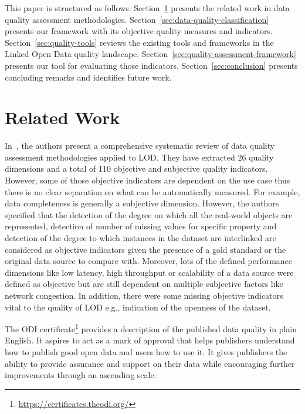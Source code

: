 \documentclass[onecolumn, crcready]{../../Util/LaTEX/iosart2c}
\begin{document}
This paper is structured as follows: Section~\ref{sec:related-work} presents the related work in data quality assessment methodologies. Section~\ref{sec:data-quality-classification} presents our framework with its objective quality measures and indicators. Section~\ref{sec:quality-tools} reviews the existing tools and frameworks in the Linked Open Data quality landscape. Section~\ref{sec:quality-assessment-framework} presents our tool for evaluating those indicators. Section~\ref{sec:conclusion} presents concluding remarks and identifies future work.


\section{Related Work}
\label{sec:related-work}
In~\cite{Zaveri:SemWebJorunal:12}, the authors present a comprehensive systematic review of data quality assessment methodologies applied to LOD. They have extracted 26 quality dimensions and a total of 110 objective and subjective quality indicators. However, some of those objective indicators are dependent on the use case thus there is no clear separation on what can be automatically measured. For example, data completeness is generally a subjective dimension. However, the authors specified that the detection of the degree on which all the real-world objects are represented, detection of number of missing values for specific property and detection of the degree to which instances in the dataset are interlinked are considered as objective indicators given the presence of a gold standard or the original data source to compare with. Moreover, lots of the defined performance dimensions like low latency, high throughput or scalability of a data source were defined as objective but are still dependent on multiple subjective factors like network congestion. In addition, there were some missing objective indicators vital to the quality of LOD e.g., indication of the openness of the dataset.

The ODI certificate\footnote{\url{https://certificates.theodi.org/}} provides a description of the published data quality in plain English. It aspires to act as a mark of approval that helps publishers understand how to publish good open data and users how to use it. It gives publishers the ability to provide assurance and support on their data while encouraging further improvements through an ascending scale.
\end{document}
